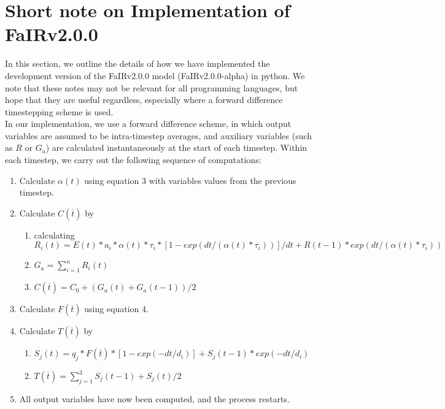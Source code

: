 \documentclass[gmd, manuscript]{copernicus}
\begin{document}
\section{Short note on Implementation of FaIRv2.0.0}
In this section, we outline the details of how we have implemented the development version of the FaIRv2.0.0 model (FaIRv2.0.0-alpha) in python. We note that these notes may not be relevant for all programming languages, but hope that they are useful regardless, especially where a forward difference timestepping scheme is used.\\
In our implementation, we use a forward difference scheme, in which output variables are assumed to be intra-timestep averages, and auxiliary variables (such as $R$ or $G_a$) are calculated instantaneously at the start of each timestep. Within each timestep, we carry out the following sequence of computations:\\
\begin{enumerate}
\item Calculate $\alpha(t)$ using equation 3 with variables values from the previous timestep.
\item Calculate $C(\overline{t})$ by
\begin{enumerate}
\item calculating $R_i(t) = E(t)*a_i*\alpha(t)*\tau_i*[1-exp(dt/(\alpha(t)*\tau_i))]/dt + R(t-1) * exp(dt/(\alpha(t)*\tau_i))$
\item $G_a = \sum_{i=1}^n{R_i(t)}$
\item $C(\overline{t}) = C_0 + (G_a(t)+G_a(t-1))/2$
\end{enumerate}
\item Calculate $F(\overline{t})$ using equation 4.
\item Calculate $T(\overline{t})$ by
\begin{enumerate}
\item $S_j(t) = q_j * F(\overline{t}) * [1-exp(-dt/d_i)] + S_j(t-1) * exp(-dt/d_i)$
\item $T(\overline{t}) = \sum_{j=1}^3{S_j(t-1)+S_j(t)/2}$
\end{enumerate}
\item All output variables have now been computed, and the process restarts.
\end{enumerate}
\end{document}
